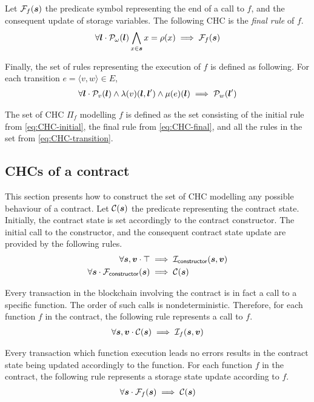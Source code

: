 Let $\mathcal{F}_f(\boldsymbol{s})$ the predicate symbol
representing the end of a call to $f$, and the consequent
update of storage variables. The following CHC is the 
{\em final rule} of $f$.
\begin{align}
\label{eq:CHC-final}
\forall\lvar\cdot\pred_\omega(\lvar)\bigwedge_{x\in\svar}x=\rho(x)\implies\finP_f(\svar)
\end{align}

Finally, the set of rules representing the execution of $f$ is defined as following.
For each transition $e=\langle v,w\rangle\in E$,
\begin{align}
\label{eq:CHC-transition}
\forall\lvar\cdot\pred_v(\lvar)\wedge\lambda(v)(\lvar,\lvar')\wedge\mu(e)(\lvar)\implies\pred_w(\lvar')	
\end{align}

The set of CHC $\Pi_f$ modelling $f$ is defined as the set
consisting of the initial rule from \cref{eq:CHC-initial},
the final rule from \cref{eq:CHC-final}, and all the 
rules in the set from \cref{eq:CHC-transition}.

\subsection{CHCs of a contract}
This section presents how to construct the set of CHC 
modelling any possible behaviour of a contract.
Let $\mathcal{C}(\boldsymbol{s})$ the predicate representing the contract state.
Initially, the contract state is set accordingly to the contract
constructor. 
The initial call to the constructor, and the consequent 
contract state update are provided by the following rules.
\begin{align}
\label{eq:CHC-constructor-initial}
\forall\svar,\farg\cdot\top&\implies\inP_\mathsf{constructor}(\svar,\farg)\\
\label{eq:CHC-constructor-final}
\forall\svar\cdot\finP_\mathsf{constructor}(\svar)&\implies\conP(\svar)
\end{align}

Every transaction in the blockchain
involving the contract is in fact a call
to a specific function. The order of such calls is
nondeterministic. Therefore, for each function $f$ in the contract, 
the following rule represents a call to $f$.
\begin{align}
\label{eq:CHC-call-initial}
\forall\svar,\farg\cdot\conP(\svar)\implies\inP_f(\svar,\farg)
\end{align}

Every transaction which function execution
leads no errors results in the contract state being updated
accordingly to the function. 
For each function $f$ in the contract, 
the following rule represents a storage state update
according to $f$.
\begin{align}
\label{eq:CHC-call-final}
\forall\svar\cdot\finP_f(\svar)\implies\conP(\svar)
\end{align}

